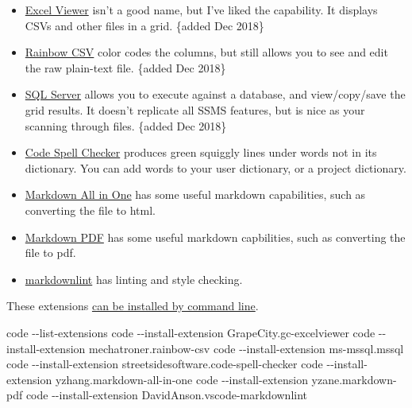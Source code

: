 \documentclass[
]{book}
\newenvironment{Shaded}{\begin{snugshade}}{\end{snugshade}}
\newcommand{\ExtensionTok}[1]{#1}
\newcommand{\NormalTok}[1]{#1}
\begin{document}
\begin{itemize}
\item
  \href{https://marketplace.visualstudio.com/items?itemName=GrapeCity.gc-excelviewer}{Excel Viewer} isn't a good name, but I've liked the capability. It displays CSVs and other files in a grid. \{added Dec 2018\}
\item
  \href{https://marketplace.visualstudio.com/items?itemName=mechatroner.rainbow-csv}{Rainbow CSV} color codes the columns, but still allows you to see and edit the raw plain-text file. \{added Dec 2018\}
\item
  \href{https://marketplace.visualstudio.com/items?itemName=ms-mssql.mssql}{SQL Server} allows you to execute against a database, and view/copy/save the grid results. It doesn't replicate all SSMS features, but is nice as your scanning through files. \{added Dec 2018\}
\item
  \href{https://marketplace.visualstudio.com/items?itemName=streetsidesoftware.code-spell-checker}{Code Spell Checker} produces green squiggly lines under words not in its dictionary. You can add words to your user dictionary, or a project dictionary.
\item
  \href{https://marketplace.visualstudio.com/items?itemName=yzhang.markdown-all-in-one}{Markdown All in One} has some useful markdown capabilities, such as converting the file to html.
\item
  \href{https://marketplace.visualstudio.com/items?itemName=yzane.markdown-pdf}{Markdown PDF} has some useful markdown capbilities, such as converting the file to pdf.
\item
  \href{https://marketplace.visualstudio.com/items?itemName=DavidAnson.vscode-markdownlint}{markdownlint} has linting and style checking.
\end{itemize}

These extensions \href{https://code.visualstudio.com/docs/editor/command-line\#_working-with-extensions}{can be installed by command line}.

\begin{Shaded}
\begin{Highlighting}[]
\ExtensionTok{code}\NormalTok{ {-}{-}list{-}extensions}
\ExtensionTok{code}\NormalTok{ {-}{-}install{-}extension GrapeCity.gc{-}excelviewer}
\ExtensionTok{code}\NormalTok{ {-}{-}install{-}extension mechatroner.rainbow{-}csv}
\ExtensionTok{code}\NormalTok{ {-}{-}install{-}extension ms{-}mssql.mssql}
\ExtensionTok{code}\NormalTok{ {-}{-}install{-}extension streetsidesoftware.code{-}spell{-}checker}
\ExtensionTok{code}\NormalTok{ {-}{-}install{-}extension yzhang.markdown{-}all{-}in{-}one}
\ExtensionTok{code}\NormalTok{ {-}{-}install{-}extension yzane.markdown{-}pdf}
\ExtensionTok{code}\NormalTok{ {-}{-}install{-}extension DavidAnson.vscode{-}markdownlint}
\end{Highlighting}
\end{Shaded}
\end{document}

